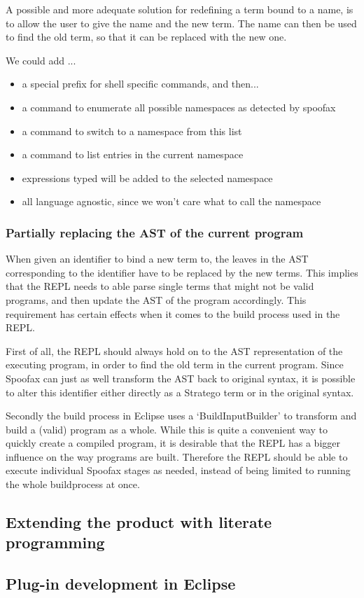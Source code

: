 A possible and more adequate solution for redefining a term bound to a
name, is to allow the user to give the name and the new term. The name
can then be used to find the old term, so that it can be replaced with
the new one.

We could add ...
\begin{itemize}
\item a special prefix for shell specific commands, and then...
\item a command to enumerate all possible namespaces as detected by spoofax
\item a command to switch to a namespace from this list
\item a command to list entries in the current namespace
\item expressions typed will be added to the selected namespace
\item all language agnostic, since we won't care what to call the namespace
\end{itemize}

\subsubsection{Partially replacing the AST of the current program}
When given an identifier to bind a new term to, the leaves in the AST
corresponding to the identifier have to be replaced by the new terms.
This implies that the REPL needs to able parse single terms that might
not be valid programs, and then update the AST of the program accordingly.
This requirement has certain effects when it comes to the build process
used in the REPL.

First of all, the REPL should always hold on to the AST representation of the
executing program, in order to find the old term in the current program.
Since Spoofax can just as well transform the AST back to original syntax,
it is possible to alter this identifier either directly as a Stratego term or
in the original syntax.

Secondly the build process in Eclipse uses a `BuildInputBuilder' to transform
and build a (valid) program as a whole. While this is quite a convenient way to
quickly create a compiled program, it is desirable that the REPL has a bigger
influence on the way programs are built.
Therefore the REPL should be able to execute individual Spoofax stages
as needed, instead of being limited to running the whole buildprocess at once.

\subsection{Extending the product with literate programming}
\label{sec:extend-prod-with}

\subsection{Plug-in development in Eclipse}
\label{ssec:eclipse-plugins}

